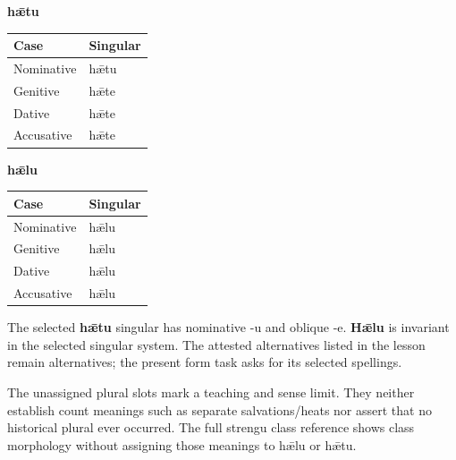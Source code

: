 \par\begin{minipage}{\linewidth}\raggedright
\textbf{hǣtu}

\par\begingroup
\fontsize{10.5}{13.2}\selectfont
\setlength{\LTleft}{0pt}\setlength{\LTright}{\fill}
\noindent
\begin{tabular}{@{}>{\raggedright\arraybackslash}p{60.59mm}>{\raggedright\arraybackslash}p{60.59mm}@{}}
\toprule
\textbf{Case} & \textbf{Singular} \\
\midrule
Nominative & hǣtu \\
Genitive & hǣte \\
Dative & hǣte \\
Accusative & hǣte \\
\bottomrule
\end{tabular}
\par\endgroup

\textbf{hǣlu}

\par\begingroup
\fontsize{10.5}{13.2}\selectfont
\setlength{\LTleft}{0pt}\setlength{\LTright}{\fill}
\noindent
\begin{tabular}{@{}>{\raggedright\arraybackslash}p{60.59mm}>{\raggedright\arraybackslash}p{60.59mm}@{}}
\toprule
\textbf{Case} & \textbf{Singular} \\
\midrule
Nominative & hǣlu \\
Genitive & hǣlu \\
Dative & hǣlu \\
Accusative & hǣlu \\
\bottomrule
\end{tabular}
\par\endgroup

The selected \textbf{hǣtu} singular has nominative -u and oblique -e. \textbf{Hǣlu} is invariant in the selected singular system. The attested alternatives listed in the lesson remain alternatives; the present form task asks for its selected spellings.

The unassigned plural slots mark a teaching and sense limit. They neither establish count meanings such as separate salvations/\allowbreak{}heats nor assert that no historical plural ever occurred. The full strengu class reference shows class morphology without assigning those meanings to hǣlu or hǣtu.

\end{minipage}\par\addvspace{4pt}

